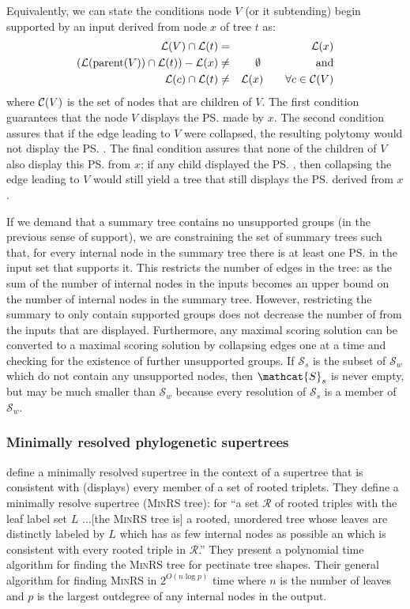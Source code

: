 \documentclass[11pt]{article}
\begin{document}
Equivalently, we can state the conditions node $V$ (or it subtending) begin supported
    by an input \pss derived from node $x$ of tree $t$ as:
\begin{eqnarray}
    \mathcal{L}(V) \cap \mathcal{L}(t) & = & \mathcal{L}(x)\\
    \left(\mathcal{L}(\mbox{parent}(V)) \cap \mathcal{L}(t)\right) - \mathcal{L}(x) & \neq &\emptyset\hskip 5em \mbox{and}\\
    \mathcal{L}(c) \cap \mathcal{L}(t) & \neq & \mathcal{L}(x) \hskip 2em \forall c \in \mathcal{C}(V)
\end{eqnarray}
where $\mathcal{C}(V)$ is the set of nodes that are children of $V$.
The first condition guarantees that the node $V$ displays the \ps made by $x$.
The second condition assures that if the edge leading to $V$ were collapsed, the resulting polytomy would not display the \ps.
The final condition assures that none of the children of $V$ also display this \ps from $x$;
    if any child displayed the \ps, then collapsing the edge leading to $V$ would still
    yield a tree that still displays the \ps derived from $x$.

If we demand that a summary tree contains no unsupported groups (in the previous sense of support), we 
    are constraining the set of summary trees such that, for every internal node in the summary tree
    there is at least one \ps in the input set that supports it.
This restricts the number of edges in the tree: as the sum of the number of internal nodes in the inputs becomes an upper bound
    on the number of internal nodes in the summary tree.
However, restricting the summary to only contain supported groups does not decrease the 
    number of \pss from the inputs that are displayed.
Furthermore, any maximal scoring solution can be converted to a maximal scoring
    solution by collapsing edges one at a time and checking for the existence of further
    unsupported groups.
If $\mathcal{S}_s$ is the subset of $\mathcal{S}_w$ which do not contain any unsupported nodes,
    then $\mathcat{S}_s$ is never empty, but may be much smaller than $\mathcal{S}_w$ because
    every resolution of $\mathcal{S}_s$ is a member of $\mathcal{S}_w$.

\subsubsection{Minimally resolved phylogenetic supertrees} \label{minrs}
\citet{JanssonLL2012} define a minimally resolved supertree in the context of 
    a supertree that is consistent with (displays) every member of a set of 
    rooted triplets.
They define a minimally resolve supertree (\textsc{MinRS} tree): for ``a set $\mathcal{R}$ of rooted 
    triples with the leaf label set $L$ $\ldots$[the \textsc{MinRS} tree is] a 
    rooted, unordered tree whose leaves are distinctly labeled by $L$ which has as few internal
    nodes as possible an which is consistent with every rooted triple in $\mathcal{R}$.''
They present a polynomial time algorithm for finding the \textsc{MinRS} tree for pectinate tree shapes.
Their general algorithm for finding \textsc{MinRS} in $2^{O(n\log p)}$ time where $n$ is the number of 
    leaves and $p$ is the largest outdegree of any internal nodes in the output.
\end{document}
